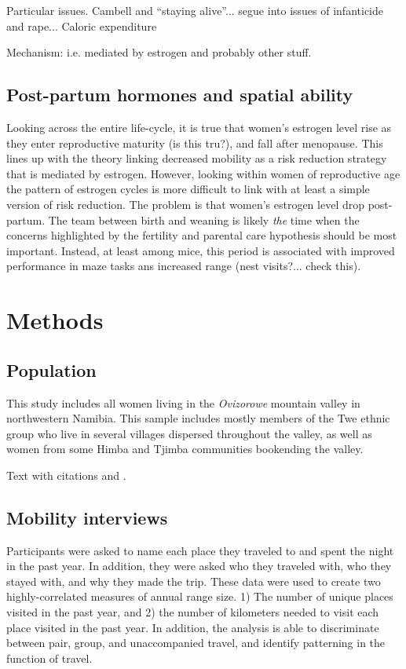 Particular issues.  Cambell and ``staying alive''... segue into issues of infanticide and rape...  Caloric expenditure

Mechanism: i.e. mediated by estrogen and probably other stuff.

	\subsection{Post-partum hormones and spatial ability}
	\label{sec:1.2}
Looking across the entire life-cycle, it is true that women's estrogen level rise as they enter reproductive maturity (is this tru?), and fall after menopause.  This lines up with the theory linking decreased mobility as a risk reduction strategy that is mediated by estrogen.  However, looking within women of reproductive age the pattern of estrogen cycles is more difficult to link with at least a simple version of risk reduction.  The problem is that women's estrogen level drop post-partum.  The team between  birth and weaning is likely \emph{the} time when the concerns highlighted by the fertility and parental care hypothesis should be most important. Instead, at least among mice, this period is associated with improved performance in maze tasks ans increased range (nest visits?... check this). 

\section{Methods}
\label{sec:2}
	\subsection{Population}
This study includes all women living in the \emph{Ovizorowe} mountain valley in northwestern Namibia.  This sample includes mostly members of the Twe ethnic group who live in several villages dispersed throughout the valley, as well as women from some Himba and Tjimba communities bookending the valley. 


Text with citations \cite{RefB} and \cite{RefJ}.
	\subsection{Mobility interviews}
	\label{sec:2.1}
Participants were asked to name each place they traveled to and spent the night in the past year.  In addition, they were asked who they traveled with, who they stayed with, and why they made the trip.  These data were used to create two highly-correlated measures of annual range size.  1) The number of unique places visited in the past year, and 2) the number of kilometers needed to visit each place visited in the past year.  In addition, the analysis is able to discriminate between pair, group, and unaccompanied travel, and identify patterning in the function of travel.
 	
